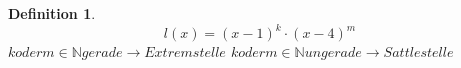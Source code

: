 \documentclass{book}
\newtheorem{definition}{Definition}
\begin{document}
\begin{definition}
\[l(x) = (x-1)^k \cdot (x-4)^m\]
$ k oder m \in \mathbb{N} gerade \rightarrow Extremstelle$
$ k oder m \in \mathbb{N} ungerade \rightarrow Sattlestelle$
\end{definition}
\end{document}

